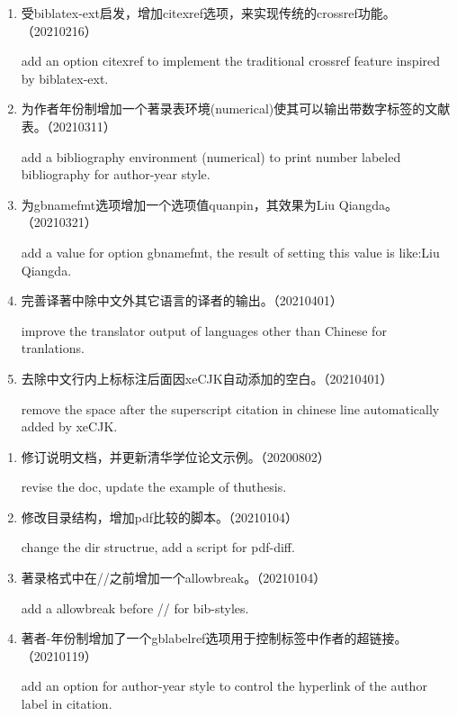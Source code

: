 \begin{enumerate}

\item 受biblatex-ext启发，增加citexref选项，来实现传统的crossref功能。（20210216）

add an option citexref to implement the traditional crossref feature inspired by biblatex-ext.


\item 为作者年份制增加一个著录表环境(numerical)使其可以输出带数字标签的文献表。（20210311）

add a bibliography environment (numerical) to print number labeled bibliography for author-year style.


\item 为gbnamefmt选项增加一个选项值quanpin，其效果为Liu Qiangda。（20210321）

add a value for option gbnamefmt, the result of setting this value is like:Liu Qiangda.


\item 完善译著中除中文外其它语言的译者的输出。（20210401）

improve the translator output of languages other than Chinese for tranlations.

\item 去除中文行内上标标注后面因xeCJK自动添加的空白。（20210401）

remove the space after the superscript citation in chinese line automatically added by xeCJK.
\end{enumerate}



\label{up:20210119}

\begin{enumerate}

\item 修订说明文档，并更新清华学位论文示例。（20200802）

revise the doc, update the example of thuthesis.

\item 修改目录结构，增加pdf比较的脚本。（20210104）

change the dir structrue, add a script for pdf-diff.

\item 著录格式中在//之前增加一个allowbreak。（20210104）

add a allowbreak before // for bib-styles.

\item 著者-年份制增加了一个gblabelref选项用于控制标签中作者的超链接。（20210119）

add an option for author-year style to control the hyperlink of the author label in citation.


\end{enumerate}



